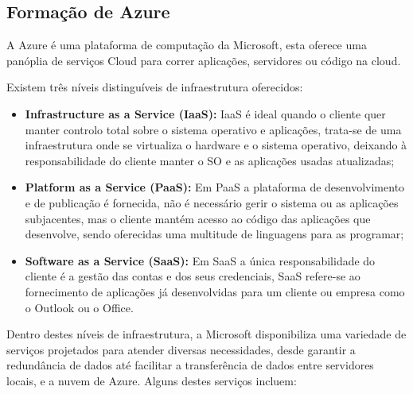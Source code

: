     \subsection{Formação de Azure}\label{subsec:azure}

      A Azure é uma plataforma de computação da Microsoft, esta oferece uma panóplia de serviços Cloud para correr aplicações, servidores ou código na cloud.

      Existem três níveis distinguíveis de infraestrutura oferecidos: 
      \begin{itemize}
        \item \textbf{Infrastructure as a Service (IaaS):} IaaS é ideal quando o cliente quer manter controlo total sobre o sistema operativo e aplicações, trata-se de uma infraestrutura onde se virtualiza o hardware e o sistema operativo, deixando à responsabilidade do cliente manter o SO e as aplicações usadas atualizadas;
        \item \textbf{Platform as a Service (PaaS):} Em PaaS a plataforma de desenvolvimento e de publicação é fornecida, não é necessário gerir o sistema ou as aplicações subjacentes, mas o cliente mantém acesso ao código das aplicações que desenvolve, sendo oferecidas uma multitude de linguagens para as programar;
        \item \textbf{Software as a Service (SaaS):} Em SaaS a única responsabilidade do cliente é a gestão das contas e dos seus credenciais, SaaS refere-se ao fornecimento de aplicações já desenvolvidas para um cliente ou empresa como o Outlook ou o Office.
      \end{itemize}

      Dentro destes níveis de infraestrutura, a Microsoft disponibiliza uma variedade de serviços projetados para atender diversas necessidades, desde garantir a redundância de dados até facilitar a transferência de dados entre servidores locais, e a nuvem de Azure. Alguns destes serviços incluem:


